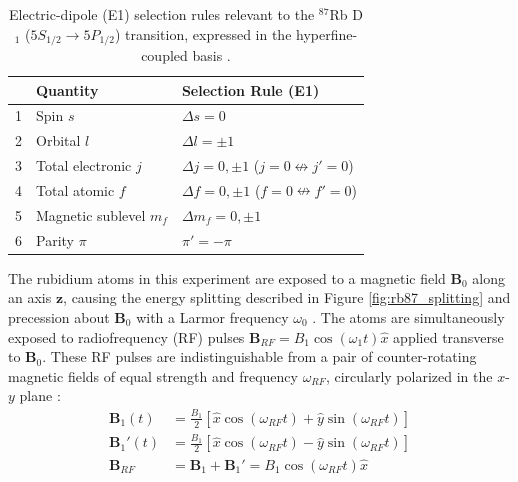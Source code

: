 \documentclass[11pt]{article}
\begin{document}
\begin{table}[H]
  \centering
  \begin{tabular}{cll}
    \hline
    \textbf{} & \textbf{Quantity} & \textbf{Selection Rule (E1)} \\
    \hline
    1 & Spin $s$
    & $\Delta s = 0$ \\

    2 & Orbital $l$
    & $\Delta l = \pm1$ \\

    3 & Total electronic $j$
    & $\Delta j = 0,\pm1$ \; ($j=0 \nleftrightarrow j'=0$) \\

    4 & Total atomic $f$
    & $\Delta f = 0,\pm1$ \; ($f=0 \nleftrightarrow f'=0$) \\

    5 & Magnetic sublevel $m_f$
    & $\Delta m_f = 0,\pm1$ \\

    6 & Parity $\pi$
    & $\pi' = -\pi$ \\
    \hline
  \end{tabular}
  \caption{Electric-dipole (E1) selection rules relevant to the $^{87}$Rb D$_1$
    ($5S_{1/2}\rightarrow5P_{1/2}$) transition, expressed in the
  hyperfine-coupled basis \cite{qmech, harris}.}
  \label{tab:e1_selection_rules_corrected}
\end{table}

The rubidium atoms in this experiment are exposed to a magnetic
field $\mathbf{B}_0$ along an axis $\mathbf{z}$, causing the energy splitting
described in Figure \ref{fig:rb87_splitting} and precession about
$\mathbf{B}_0$ with a Larmor frequency $\omega_0$ \cite{harris}.
The atoms are simultaneously exposed to radiofrequency (RF) pulses
$\mathbf{B}_{RF} = B_1 \cos(\omega_1 t) \hat x$ applied transverse to
$\mathbf{B}_0$. These RF pulses are indistinguishable from a pair of
counter-rotating magnetic fields of equal strength and frequency
$\omega_{RF}$, circularly polarized in the $x$-$y$ plane \cite{griff}:
\begin{align}
  \mathbf{B}_{1}(t) &= \frac{B_1}{2}\left[\hat x\cos(\omega_{RF} t)+\hat
  y\sin(\omega_{RF} t)\right] \\
  \mathbf{B}_{1}'(t) &= \frac{B_1}{2}\left[\hat x\cos(\omega_{RF} t)-\hat
  y\sin(\omega_{RF} t)\right] \\
  \mathbf{B}_{RF} &= \mathbf{B}_{1} + \mathbf{B}_{1}' = B_1
  \cos(\omega_{RF} t) \hat x
\end{align}
\end{document}
